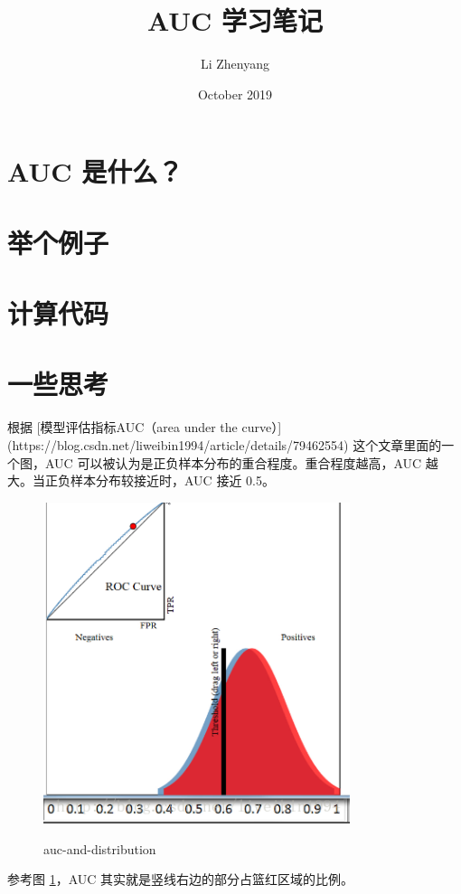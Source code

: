 \documentclass{article}
\title{AUC 学习笔记}
\author{Li Zhenyang}
\date{October 2019}
\begin{document}
   \maketitle
   \section{AUC 是什么？}
   \section{举个例子}
   \section{计算代码}
   \section{一些思考}
   根据 [模型评估指标AUC（area under the curve）](https://blog.csdn.net/liweibin1994/article/details/79462554) 这个文章里面的一个图，AUC 可以被认为是正负样本分布的重合程度。重合程度越高，AUC 越大。当正负样本分布较接近时，AUC 接近 0.5。
   \begin{figure}[h]
       \includegraphics[width=0.8\textwidth]{auc-and-distribution.png}
       \label{auc-and-distribution}
       \caption{auc-and-distribution}
   \end{figure}


   参考图 \ref{auc-and-distribution}，AUC 其实就是竖线右边的部分占篮红区域的比例。
\end{document}
